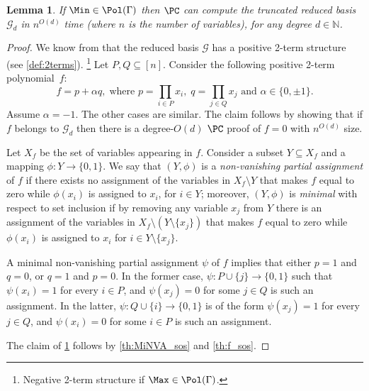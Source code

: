 \documentclass[11pt]{article}
\newtheorem{lemma}[theorem]{Lemma}
\begin{document}
\begin{lemma}\label{th:Min}
If $\Min\in\Pol(\Gamma)$ then $\PC$ can compute the truncated reduced \GB basis $\mathcal{G}_d$ in $n^{O(d)}$ time (where $n$ is the number of variables), for any degree $d\in \mathbb{N}$.
\end{lemma}
\begin{proof}
We know from \cite{Mastrolilli21TALG} that the reduced \GB basis $\mathcal{G}$ has a positive 2-term structure (see \cref{def:2terms}). \footnote{Negative 2-term structure if $\Max\in\Pol(\Gamma)$.} Let $P,Q\subseteq [n]$.  Consider the following positive 2-term polynomial~$f$:
%
\begin{equation*}
f = p +\alpha q, \;
\text{where } p = \prod_{i\in P} x_i,\; q = \prod_{j\in Q} x_j \text{ and } \alpha \in \{0,\pm 1\}.
\end{equation*}
% 
Assume $\alpha = -1$. The other cases are similar. The claim follows by showing that if $f$ belongs to $\mathcal{G}_d$ then there is a degree-$O(d)$ $\PC$ proof of $f=0$ with $n^{O(d)}$ size. 

Let $X_f$ be the set of variables appearing in $f$. Consider a subset $Y\subseteq X_f$ and a mapping $\phi: Y\rightarrow \{0,1\}$. We say that $(Y,\phi)$ is a \emph{non-vanishing partial assignment} of $f$ if there exists no assignment of the variables in $X_f\setminus Y$ that makes $f$ equal to zero while {$\phi(x_i)$ is assigned to $x_i$}, for $i\in Y$; moreover, $(Y,\phi)$ is \emph{minimal} with respect to set inclusion if by removing any variable $x_j$ from $Y$ there is an assignment of the variables in $X_f\setminus (Y\setminus\{x_j\})$ that makes $f$ equal to zero while {$\phi(x_i)$ is assigned to $x_i$} for $i\in Y\setminus\{x_j\}$.

A minimal non-vanishing partial assignment {$\psi$} of $f$ implies that either $p=1$ and $q=0$, or $q=1$ and $p=0$. {In the former case, $\psi:P\cup\{j\}\rightarrow \{0,1\}$ such that $\psi(x_i)=1$ for every $i\in P$, and $\psi(x_j)=0$ for some $j \in Q$ is such an assignment.
In the latter, $\psi:Q\cup\{i\}\rightarrow \{0,1\}$ is of the form $\psi(x_j)=1$ for every $j\in Q$, and $\psi(x_i)=0$ for some $i \in P$ is such an assignment.}

The claim of \cref{th:Min} follows by \cref{th:MiNVA_sos} and \cref{th:f_sos}.
\end{proof}
%
\end{document}
